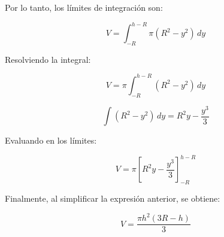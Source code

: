 \documentclass{article}
\begin{document}
Por lo tanto, los límites de integración son:

\begin{equation}
V = \int_{-R}^{h-R} \pi (R^2 - y^2)\,dy
\end{equation}

Resolviendo la integral:

\begin{equation}
V = \pi \int_{-R}^{h-R} (R^2 - y^2)\,dy
\end{equation}

\begin{equation}
\int (R^2 - y^2)\,dy = R^2 y - \frac{y^3}{3}
\end{equation}

Evaluando en los límites:

\begin{equation}
V = \pi \left[ R^2 y - \frac{y^3}{3} \right]_{-R}^{h-R}
\end{equation}

Finalmente, al simplificar la expresión anterior, se obtiene:

\begin{equation}
V = \frac{\pi h^2 (3R - h)}{3}
\end{equation}
\end{document}
